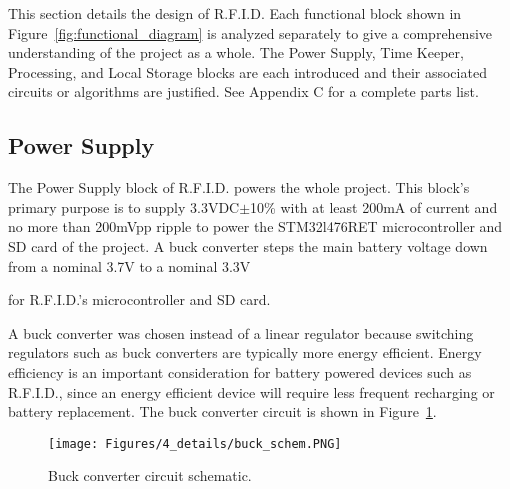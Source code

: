This section details the design of R.F.I.D. Each functional block shown in Figure~\ref{fig:functional_diagram} is analyzed separately to give a comprehensive understanding of the project as a whole. The Power Supply, Time Keeper, Processing, and Local Storage blocks are each introduced and their associated circuits or algorithms are justified. See Appendix C for a complete parts list.

\subsection{Power Supply}

The Power Supply block of R.F.I.D. powers the whole project. This block's primary purpose is to supply 3.3VDC$\pm$10\% with at least 200mA of current \DIFdelbegin \DIFdel{, }\DIFdelend and no more than 200mVpp ripple to power the STM32l476RET microcontroller and SD card of the project. A buck converter steps the main battery voltage down from a nominal 3.7V to a nominal 3.3V \DIFdelbegin {}%

\DIFdelend for R.F.I.D.'s microcontroller and SD card.
\DIFaddbegin 


\DIFaddend A buck converter was chosen instead of a linear regulator because switching regulators such as buck converters are typically more energy efficient. Energy efficiency is an important consideration for battery powered devices such as R.F.I.D., since an energy efficient device will require less frequent recharging or battery replacement. The buck converter circuit is shown in Figure~\ref{fig:buck_conv_schem}.

\begin{figure}[H]
    \centering
    \texttt{[image: Figures/4\_details/buck\_schem.PNG]} 
    \caption{Buck converter circuit schematic.}
    \label{fig:buck_conv_schem}
\end{figure}

